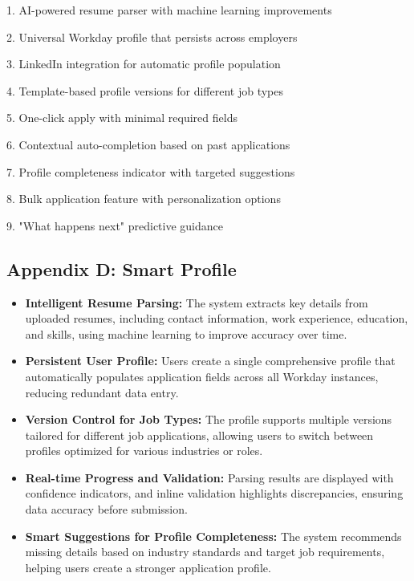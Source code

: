 \documentclass[
	letterpaper, %
]{jdf}
\begin{document}
\begin{sloppypar}
1. AI-powered resume parser with machine learning improvements

2. Universal Workday profile that persists across employers

3. LinkedIn integration for automatic profile population

4. Template-based profile versions for different job types

5. One-click apply with minimal required fields

6. Contextual auto-completion based on past applications

7. Profile completeness indicator with targeted suggestions

8. Bulk application feature with personalization options

9. "What happens next" predictive guidance

\hfill \break
\subsection{Appendix D: Smart Profile}
 
\begin{itemize}
    \item \textbf{Intelligent Resume Parsing:} The system extracts key details from uploaded resumes, including contact information, work experience, education, and skills, using machine learning to improve accuracy over time.
    
    \item \textbf{Persistent User Profile:} Users create a single comprehensive profile that automatically populates application fields across all Workday instances, reducing redundant data entry.
    
    \item \textbf{Version Control for Job Types:} The profile supports multiple versions tailored for different job applications, allowing users to switch between profiles optimized for various industries or roles.
    
    \item \textbf{Real-time Progress and Validation:} Parsing results are displayed with confidence indicators, and inline validation highlights discrepancies, ensuring data accuracy before submission.
    
    \item \textbf{Smart Suggestions for Profile Completeness:} The system recommends missing details based on industry standards and target job requirements, helping users create a stronger application profile.
    

\end{itemize}
\end{sloppypar}
\end{document}
